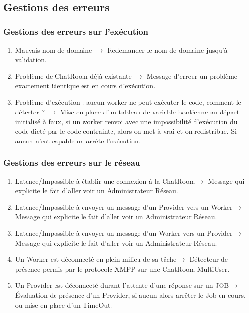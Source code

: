 \documentclass[11pt]{article}
\begin{document}
\newpage
\subsection{Gestions des erreurs}

\subsubsection{Gestions des erreurs sur l\textquoteright exécution}
\begin{enumerate}
\item Mauvais nom de domaine $ \rightarrow $ Redemander le nom de domaine jusqu'à validation.
\item Problème de ChatRoom déjà existante $\rightarrow$ Message d'erreur un problème exactement identique est en cours d'exécution.
\item Problème d'exécution : aucun worker ne peut exécuter le code, comment le détecter ? $\rightarrow$ Mise en place d'un tableau de variable booléenne au départ initialisé à faux, si un worker renvoi avec une impossibilité d\textquoteright exécution du code dicté par le code contrainte, alors on met à vrai et on redistribue. Si aucun n'est capable on arrête l\textquoteright exécution.
\end{enumerate}  
\subsubsection{Gestions des erreurs sur le réseau}
\begin{enumerate}
\item Latence/Impossible à établir une connexion à la ChatRoom$ \rightarrow $ Message qui explicite le fait d'aller voir un Administrateur Réseau.
\item Latence/Impossible à envoyer un message d'un Provider vers un Worker$ \rightarrow $ Message qui explicite le fait d'aller voir un Administrateur Réseau.
\item Latence/Impossible à envoyer un  message d'un Worker vers un Provider$ \rightarrow $ Message qui explicite le fait d'aller voir un Administrateur Réseau. 
\item Un Worker est déconnecté en plein milieu de sa tâche$ \rightarrow $ Détecteur de présence permis par le protocole XMPP sur une ChatRoom MultiUser.
\item Un Provider est déconnecté durant l'attente d'une réponse sur un JOB$ \rightarrow $ Évaluation de présence d'un Provider, si aucun alors arrêter le Job en cours, ou mise en place d'un TimeOut.
\end{enumerate}
\end{document}
